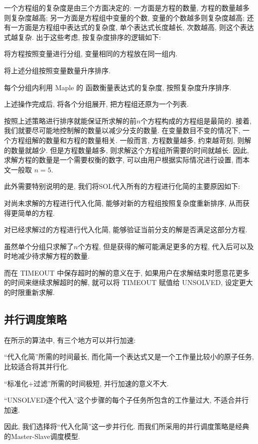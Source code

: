 一个方程组的复杂度是由三个方面决定的: 一方面是方程的数量, 方程的数量越多则复杂度越高; 另一方面是方程组中变量的个数, 变量的个数越多则复杂度越高; 还有一方面是方程组中表达式的复杂度, 单个表达式长度越长, 次数越高, 则这个表达式越复杂. 出于这些考虑, 按复杂度排序的逻辑如下:
\begin{compactenum}[(1)]
\item 将方程按照变量进行分组, 变量相同的方程放在同一组内.
\item 将上述分组按照变量数量升序排序.
\item 每个分组内利用 Maple 的  函数衡量表达式的复杂度, 按照复杂度升序排序.  
\item 上述操作完成后, 将各个分组展开, 把方程组还原为一个列表. 
\end{compactenum}

按照上述策略进行排序就能保证所求解的前$n$个方程构成的方程组是最简的. 接着, 我们就要尽可能地控制解的数量以减少分支的数量. 在变量数目不变的情况下, 一个方程组解的数量和方程的数量相关. 一般而言, 方程数量越多, 约束越苛刻, 则解的数量就越少. 但是方程数量越多, 则求解这个方程组所需要的时间就越长. 因此, 求解方程的数量是一个需要权衡的数字, 可以由用户根据实际情况进行设置, 而本文一般取 $n=5$.

此外需要特别说明的是, 我们将SOL代入所有的方程进行化简的主要原因如下: 
\begin{compactenum}[(1)]
\item 对尚未求解的方程进行代入化简, 能够对新的方程组按照复杂度重新排序, 从而获得更简单的方程.
\item 对已经求解过的方程进行代入化简, 能够验证当前分支的解是否满足这部分方程. 
\item 虽然单个分组只求解了$n$个方程, 但是获得的解可能满足更多的方程, 代入后可以及时地减少待求解方程的数量. 
\end{compactenum} 

而在 TIMEOUT 中保存超时的解的意义在于, 如果用户在求解结束时愿意花更多的时间来继续求解超时的解, 就可以将 TIMEOUT 赋值给 UNSOLVED, 设定更大的时限重新求解. 

\subsection{并行调度策略} 
在所示的算法中, 有三个地方可以并行加速:  
\begin{compactitem}[\textbullet]
\item ``代入化简''所需的时间最长, 而化简一个表达式又是一个工作量比较小的原子任务, 比较适合将其并行化.
\item ``标准化+过滤''所需的时间极短, 并行加速的意义不大.
\item ``UNSOLVED逐个代入''这个步骤的每个子任务所包含的工作量过大, 不适合并行加速.
\end{compactitem}
因此, 我们选择将``代入化简''这一步并行化. 而我们所采用的并行调度策略是经典的Master-Slave调度模型\cite{sahni1996master}. 

